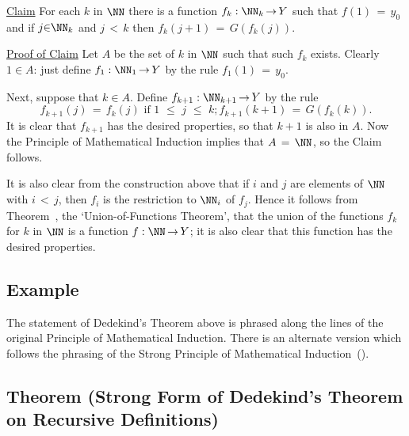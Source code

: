 \V

        \underline{Claim} For each $k$ in ${\NN}$ there is a function $f_{k}:{\NN}_{k} \,{\rightarrow}\, Y$
    such that $f(1) \,=\, y_{0}$ and if $j{\in}{\NN}_{k}$ and $j\,<\,k$ then $f_{k}(j+1) \,=\, G(f_{k}(j))$.

        \underline{Proof of Claim} Let $A$ be the set of $k$ in ${\NN}$ such that such $f_{k}$ exists.
    Clearly $1{\in}A$: just define $f_{1}:{\NN}_{1} \,{\rightarrow}\, Y$ by the rule $f_{1}(1) \,=\, y_{0}$.

        Next, suppose that $k{\in}A$. Define $f_{k+1}:{\NN}_{k+1} \,{\rightarrow}\, Y$ by the rule
        \begin{displaymath}
        f_{k+1}(j) \,=\, f_{k}(j) \mbox{ if $1\,\,{\leq}\,\,j\,\,{\leq}\,\,k$};
        f_{k+1}(k+1) \,=\, G(f_{k}(k)).
        \end{displaymath}
    It is clear that $f_{k+1}$ has the desired properties, so that $k+1$ is also in $A$.
    Now the Principle of Mathematical Induction implies that $A \,=\, {\NN}$, so the Claim follows.

    It is also clear from the construction above that if $i$ and $j$ are elements of ${\NN}$ with $i\,<\,j$, then $f_{i}$ is the restriction to ${\NN}_{i}$ of $f_{j}$.
    Hence it follows from Theorem~, the `Union-of-Functions Theorem',
    that the union of the functions $f_{k}$ for $k$ in ${\NN}$ is a function $f:{\NN} \,{\rightarrow}\, Y$;
    it is also clear that this function has the desired properties.

\V
\V

        \subsection{\small{{\bf Example}}}
        \label{ExampA40.110}

\V
\V

        The statement of Dedekind's Theorem above is phrased along the lines of the original Principle of Mathematical Induction.
    There is an alternate version which follows the phrasing of the Strong Principle of Mathematical Induction~().

\V

        \subsection{\small{{\bf Theorem}} (Strong Form of Dedekind's Theorem on Recursive Definitions)}
        \label{ThmA40.120}


